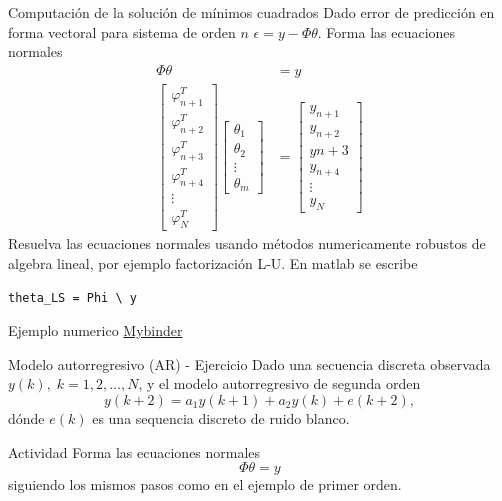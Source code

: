\documentclass[presentation,aspectratio=169]{beamer}
\begin{document}
\begin{frame}[label={sec:org87d1346},fragile]{Computación de la solución de mínimos cuadrados}
 Dado error de predicción en forma vectoral para sistema de orden \(n\)
\(\epsilon = y - \Phi\theta\). Forma las \alert{ecuaciones normales}
\begin{align*}
\Phi \theta &= y\\
\begin{bmatrix}\varphi_{n+1}^T\\\varphi_{n+2}^T\\\varphi_{n+3}^T\\\varphi_{n+4}^T\\\vdots\\\varphi_{N}^T\end{bmatrix} \begin{bmatrix}\theta_1\\\theta_2\\\vdots\\\theta_m\end{bmatrix} &= \begin{bmatrix}y_{n+1}\\y_{n+2}\\y{n+3}\\y_{n+4}\\\vdots\\ y_{N}\end{bmatrix}
\end{align*}
Resuelva las ecuaciones normales usando métodos numericamente robustos de algebra lineal, por ejemplo   factorización L-U. En matlab se escribe
\begin{verbatim}
theta_LS = Phi \ y
\end{verbatim}
\end{frame}

\begin{frame}[label={sec:org07df134}]{Ejemplo numerico}
\href{https://mybinder.org/v2/gh/kjartan-at-tec/mr2007-computerized-control/master?filepath=.\%2Fsystem-identification\%2Fnotebooks\%2FAR-example.ipynb}{Mybinder}
\end{frame}





\begin{frame}[label={sec:orgaec78da}]{Modelo autorregresivo (AR) - Ejercicio}
Dado una secuencia discreta observada \(y(k), \; k=1,2,\ldots,N\), y el modelo autorregresivo de segunda orden
\[ y(k+2) = a_1y(k+1) + a_2y(k) + e(k+2),\]
dónde \(e(k)\) es una sequencia discreto de ruido blanco.

\alert{Actividad} Forma las ecuaciones normales \[ \Phi \theta = y\] siguiendo los mismos pasos como en el ejemplo de primer orden.
\end{frame}
\end{document}

